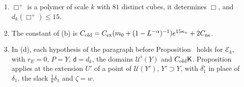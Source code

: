 \begin{detail}\label{xb:d-old}
\begin{enumerate}[label=(\alph*)]
\item $\Box^+$ is a polymer of scale $k$ with $81$ distinct cubes, it determines $\Box$, and $d_k(\Box^+)\le15$.
\item The constant of (b) is $C_{\rm old}=C_{\rm ex}(m_0+(1-L^{-\alpha})^{-1})e^{15\kappa_n}+2C_{\rm ne}$.
\item In (d), each hypothesis of the paragraph before Proposition~ holds for $\mathcal E_k$, with $r_E=0$, $P=Y$, $\mathsf d=d_k$, the domains $\mathcal U^\flat(Y)$ and $C_{\rm old}\mathsf K$. Proposition~ applies at the extension $U'$ of a point of $\mathcal U(Y')$, $Y'\supset Y$, with $\delta_1^\flat$ in place of $\delta_1$, the slack $\frac18\delta_1$ and $\zeta=w$.
\end{enumerate}
\end{detail}

